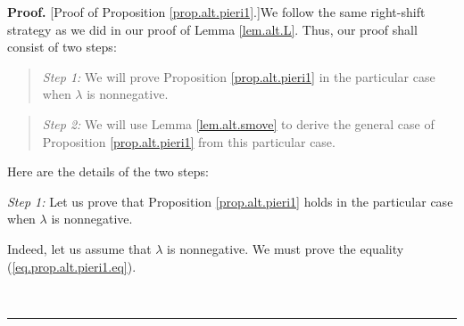 \documentclass[numbers=enddot,12pt,final,onecolumn,notitlepage]{scrartcl}%
\theoremstyle{definition}
\newenvironment{statement}{\begin{quote}}{\end{quote}}
\newenvironment{proof}[1][Proof]{\noindent\textbf{#1.} }{\ \rule{0.5em}{0.5em}}
\begin{document}
\begin{proof}
[Proof of Proposition \ref{prop.alt.pieri1}.]We follow the same right-shift
strategy as we did in our proof of Lemma \ref{lem.alt.L}. Thus, our proof
shall consist of two steps:

\begin{statement}
\textit{Step 1:} We will prove Proposition \ref{prop.alt.pieri1} in the
particular case when $\lambda$ is nonnegative.
\end{statement}

\begin{statement}
\textit{Step 2:} We will use Lemma \ref{lem.alt.smove} to derive the general
case of Proposition \ref{prop.alt.pieri1} from this particular case.
\end{statement}

Here are the details of the two steps:

\textit{Step 1:} Let us prove that Proposition \ref{prop.alt.pieri1} holds in
the particular case when $\lambda$ is nonnegative.

Indeed, let us assume that $\lambda$ is nonnegative. We must prove the
equality (\ref{eq.prop.alt.pieri1.eq}).


\end{proof}
\end{document}
